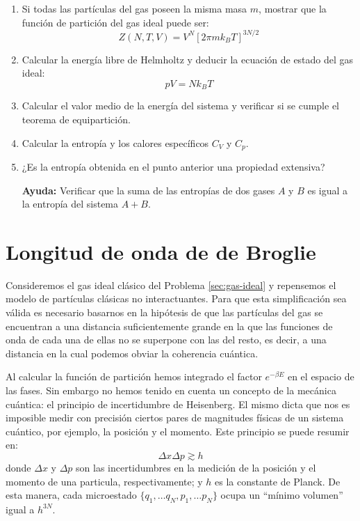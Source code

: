 \documentclass[a4paper,11pt]{article}
\begin{document}
\begin{enumerate}[label=(\alph*),
                  leftmargin=2\parindent,
                  rightmargin=2\parindent]

    \item{\label{item:gas-ideal-particion}
          Si todas las partículas del gas poseen la misma masa $m$,
          mostrar que la función de partición del gas ideal puede ser:
          $$ Z(N, T, V) = V^N \left[ 2\pi m k_B T \right]^{3N/2} $$
          }

    \item{Calcular la energía libre de Helmholtz y deducir la ecuación de
          estado del gas ideal:
          $$ pV = N k_B T $$
          }

    \item{Calcular el valor medio de la energía del sistema y
          verificar si se cumple el teorema de equipartición.
          }

    \item{Calcular la entropía y los calores específicos $C_V$ y $C_p$.
          }

    \item{¿Es la entropía obtenida en el punto anterior una propiedad
          extensiva?
          }

    {\small
    \textbf{Ayuda:} Verificar que la suma de las entropías de dos
    gases $A$ y $B$ es igual a la entropía del sistema $A + B$.
    }

\end{enumerate}


\section{Longitud de onda de de Broglie}
\label{sec:de-broglie}

Consideremos el gas ideal clásico del Problema \ref{sec:gas-ideal} y
repensemos el modelo de partículas clásicas no interactuantes. Para que esta
simplificación sea válida es necesario basarnos en la hipótesis de que las
partículas del gas se encuentran a una distancia suficientemente grande en la
que las funciones de onda de cada una de ellas no se superpone con las del
resto, es decir, a una distancia en la cual podemos obviar la coherencia
cuántica.

Al calcular la función de partición hemos integrado el factor
$e^{-\beta E}$ en el espacio de las fases. Sin embargo no hemos tenido
en cuenta un concepto de la mecánica cuántica: el principio de
incertidumbre de Heisenberg. El mismo dicta que nos es imposible medir
con precisión ciertos pares de magnitudes físicas de un sistema
cuántico, por ejemplo, la posición y el momento. Este principio se
puede resumir en:
$$ \Delta x \Delta p \gtrsim  h$$
donde $\Delta x$ y $\Delta p$ son las incertidumbres en la medición de
la posición y el momento de una particula, respectivamente; y $h$ es
la constante de Planck.
De esta manera, cada microestado
$\{ q_1, \dots q_N, p_1, \dots p_N \}$
ocupa un ``mínimo volumen'' igual a $h^{3N}$.
\end{document}
